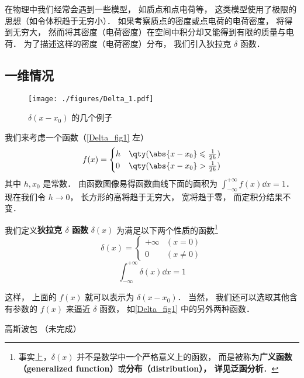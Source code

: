 
在物理中我们经常会遇到一些模型， 如质点和点电荷等， 这类模型使用了极限的思想（如令体积趋于无穷小）． 如果考察质点的密度或点电荷的电荷密度， 将得到无穷大， 然而将其密度（电荷密度）在空间中积分却又能得到有限的质量与电荷． 为了描述这样的密度（电荷密度）分布， 我们引入狄拉克 $\delta$ 函数．

\subsection{一维情况}

\begin{figure}[ht]
\centering
\texttt{[image: ./figures/Delta\_1.pdf]}
\caption{$\delta(x - x_0)$ 的几个例子} \label{Delta_fig1}
\end{figure}

我们来考虑一个函数（\autoref{Delta_fig1} 左）
\begin{equation}
f(x) =
\begin{cases}
h & \qty( \abs{x - x_0} \leqslant \frac{1}{2h} )\\
0 & \qty( \abs{x - x_0} > \frac{1}{2h} )
\end{cases}
\end{equation}
其中 $h, x_0$ 是常数． 由函数图像易得函数曲线下面的面积为 $\int_{-\infty}^{+\infty} f(x) \dd{x} = 1$． 现在我们令 $h \to 0$， 长方形的高将趋于无穷大， 宽将趋于零， 而定积分结果不变．

我们定义\textbf{狄拉克 $\delta$ 函数} $\delta(x)$ 为满足以下两个性质的函数\footnote{事实上，$\delta(x)$ 并不是数学中一个严格意义上的函数， 而是被称为\textbf{广义函数（generalized function）}或\textbf{分布（distribution）， 详见泛函分析}．} %
\begin{equation}\label{Delta_eq2}
\delta(x) =
\begin{cases}
+\infty & (x = 0)\\
0 & (x \ne 0)
\end{cases}
\end{equation}
\begin{equation}\label{Delta_eq3}
\int_{-\infty}^{+\infty} \delta(x) \dd{x} = 1
\end{equation}

这样， 上面的 $f(x)$ 就可以表示为 $\delta(x - x_0)$． 当然， 我们还可以选取其他含有参数的 $f(x)$ 来逼近 $\delta$ 函数， 如\autoref{Delta_fig1} 中的另外两种函数．

\begin{example}{高斯波包}
（未完成）
\end{example}


